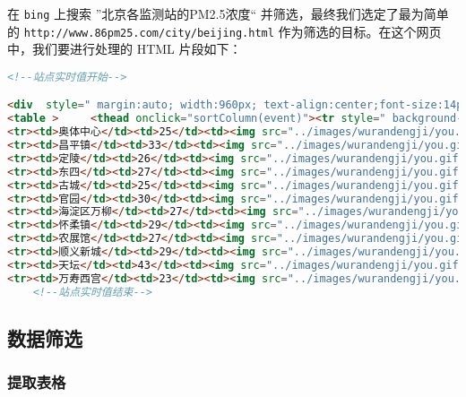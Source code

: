 \documentclass[blue,normal,cn]{elegantnote}
\newcommand{\code}[1]{\colorbox{light-gray}{\texttt{#1}}}
\begin{document}
在 \code{bing} 上搜索 ”北京各监测站的PM2.5浓度“ 并筛选，最终我们选定了最为简单的 \code{http://www.86pm25.com/city/beijing.html} 作为筛选的目标。在这个网页中，我们要进行处理的 HTML 片段如下：
\begin{lstlisting}[language=HTML]
     	<!--站点实时值开始-->

<div  style=" margin:auto; width:960px; text-align:center;font-size:14px; font-weight:bold; margin:10px;">各监测站点实时数据</div>
<table >	 <thead onclick="sortColumn(event)"><tr style=" background-color:#EBEFF7"><th width="15%"  >监测站点</th><th width="10%" >AQI</th><th width="20%"  >&nbsp;&nbsp;&nbsp;污染等级</th><th width="20%"  >PM2.5浓度</th> <th width="20%"  >PM10浓度</th> </tr></thead>
<tr><td>奥体中心</td><td>25</td><td><img src="../images/wurandengji/you.gif"  /> </td><td>8μg/m³</td><td>21μg/m³</td></tr>
<tr><td>昌平镇</td><td>33</td><td><img src="../images/wurandengji/you.gif"  /> </td><td>15μg/m³</td><td>33μg/m³</td></tr>
<tr><td>定陵</td><td>26</td><td><img src="../images/wurandengji/you.gif"  /> </td><td>12μg/m³</td><td>24μg/m³</td></tr>
<tr><td>东四</td><td>27</td><td><img src="../images/wurandengji/you.gif"  /> </td><td>14μg/m³</td><td>25μg/m³</td></tr>
<tr><td>古城</td><td>25</td><td><img src="../images/wurandengji/you.gif"  /> </td><td>16μg/m³</td><td>21μg/m³</td></tr>
<tr><td>官园</td><td>30</td><td><img src="../images/wurandengji/you.gif"  /> </td><td>11μg/m³</td><td>20μg/m³</td></tr>
<tr><td>海淀区万柳</td><td>27</td><td><img src="../images/wurandengji/you.gif"  /> </td><td>15μg/m³</td><td>—μg/m³</td></tr>
<tr><td>怀柔镇</td><td>29</td><td><img src="../images/wurandengji/you.gif"  /> </td><td>6μg/m³</td><td>—μg/m³</td></tr>
<tr><td>农展馆</td><td>27</td><td><img src="../images/wurandengji/you.gif"  /> </td><td>16μg/m³</td><td>22μg/m³</td></tr>
<tr><td>顺义新城</td><td>29</td><td><img src="../images/wurandengji/you.gif"  /> </td><td>2μg/m³</td><td>12μg/m³</td></tr>
<tr><td>天坛</td><td>43</td><td><img src="../images/wurandengji/you.gif"  /> </td><td>9μg/m³</td><td>43μg/m³</td></tr>
<tr><td>万寿西宫</td><td>23</td><td><img src="../images/wurandengji/you.gif"  /> </td><td>5μg/m³</td><td>22μg/m³</td></tr></table>
	<!--站点实时值结束-->
\end{lstlisting}

\subsection{数据筛选}

\subsubsection{提取表格}
\end{document}
